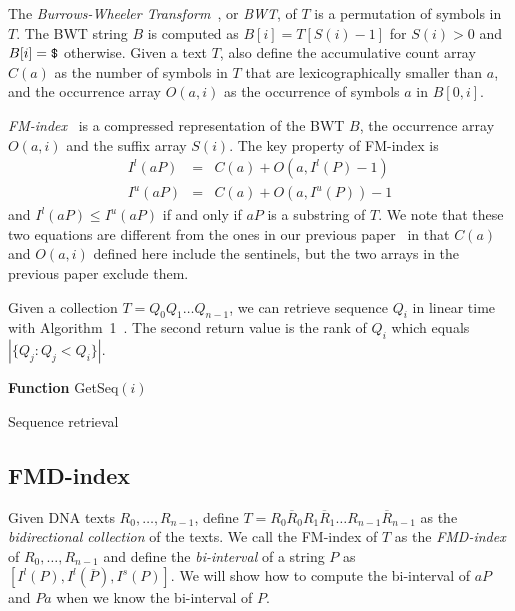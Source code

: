 \documentclass{bioinfo}
\begin{document}
\begin{methods}
The \emph{Burrows-Wheeler Transform}~\citep{Burrows:1994gd}, or \emph{BWT}, of $T$ is a permutation of
symbols in $T$. The BWT string $B$ is computed as $B[i]=T[S(i)-1]$ for
$S(i)>0$ and $B[i]=\mbox{\tt \$}$ otherwise. Given a text $T$, also define
the accumulative count array $C(a)$ as the number of symbols in $T$ that are
lexicographically smaller than $a$, and the occurrence array $O(a,i)$ as
the occurrence of symbols $a$ in $B[0,i]$.

\emph{FM-index}~\citep{DBLP:conf/focs/FerraginaM00} is a compressed representation of the BWT $B$, the occurrence
array $O(a,i)$ and the suffix array $S(i)$. The key property of FM-index is
\begin{eqnarray}\label{eq:back}
I^l(aP)&=&C(a)+O(a,I^l(P)-1)\\
I^u(aP)&=&C(a)+O(a,I^u(P))-1
\end{eqnarray}
and $I^l(aP)\le I^u(aP)$ if and only if $aP$ is a substring of $T$.
We note that these two equations are different from the ones in our previous
paper~\citep{Li:2009uq} in that $C(a)$ and $O(a,i)$ defined here include
the sentinels, but the two arrays in the previous paper exclude them.

Given a collection $T=Q_0 Q_1\ldots Q_{n-1}$, we can retrieve
sequence $Q_i$ in linear time with Algorithm~1~\citep{DBLP:conf/recomb/MakinenNSV09}.
The second return value is the rank of $Q_i$ which equals $|\{Q_j:Q_j<Q_i\}|$.

\begin{algorithm}[h]
\DontPrintSemicolon
\footnotesize
{}
\BlankLine
\textbf{Function} {\sc GetSeq}$(i)$
\caption{Sequence retrieval}
\end{algorithm}

\subsection{FMD-index}

Given DNA texts $R_0,\ldots,R_{n-1}$, define $T=R_0\overline{R}_0
R_1\overline{R}_1\ldots R_{n-1}\overline{R}_{n-1}$ as the
\emph{bidirectional collection} of the texts. We call the FM-index of $T$ as
the \emph{FMD-index} of $R_0,\ldots,R_{n-1}$ and define the \emph{bi-interval} of a
string $P$ as $[I^l(P),I^l(\overline{P}),I^s(P)]$. We will show how to compute
the bi-interval of $aP$ and $Pa$ when we know the bi-interval of $P$.


\end{methods}
\end{document}
